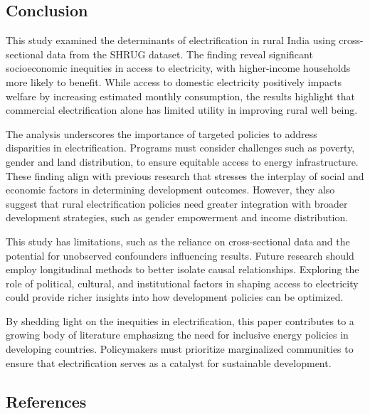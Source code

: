 \documentclass[
]{article}
\begin{document}
\hypertarget{conclusion}{%
\subsection{Conclusion}\label{conclusion}}

This study examined the determinants of electrification in rural India
using cross-sectional data from the SHRUG dataset. The finding reveal
significant socioeconomic inequities in access to electricity, with
higher-income households more likely to benefit. While access to
domestic electricity positively impacts welfare by increasing estimated
monthly consumption, the results highlight that commercial
electrification alone has limited utility in improving rural well being.

The analysis underscores the importance of targeted policies to address
disparities in electrification. Programs must consider challenges such
as poverty, gender and land distribution, to ensure equitable access to
energy infrastructure. These finding align with previous research that
stresses the interplay of social and economic factors in determining
development outcomes. However, they also suggest that rural
electrification policies need greater integration with broader
development strategies, such as gender empowerment and income
distribution.

This study has limitations, such as the reliance on cross-sectional data
and the potential for unobserved confounders influencing results. Future
research should employ longitudinal methods to better isolate causal
relationships. Exploring the role of political, cultural, and
institutional factors in shaping access to electricity could provide
richer insights into how development policies can be optimized.

By shedding light on the inequities in electrification, this paper
contributes to a growing body of literature emphasizng the need for
inclusive energy policies in developing countries. Policymakers must
prioritize marginalized communities to ensure that electrification
serves as a catalyst for sustainable development.

\newpage

\hypertarget{references}{%
\subsection{References}\label{references}}

\hfill\break
\hfill\break
\end{document}
